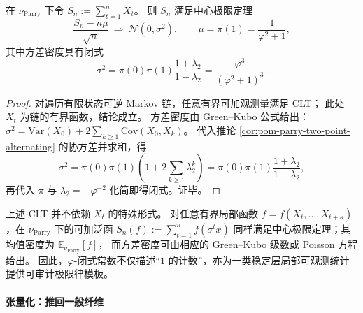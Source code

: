 \begin{theorem}\label{thm:pom-parry-ones-clt}
在 \(\nu_{\mathrm{Parry}}\) 下令
\(
S_n:=\sum_{t=1}^{n}X_t
\)。
则 \(S_n\) 满足中心极限定理
\[
\frac{S_n-n\mu}{\sqrt n}\ \Longrightarrow\ \mathcal N(0,\sigma^2),
\qquad
\mu=\pi(1)=\frac{1}{\varphi^2+1},
\]
其中方差密度具有闭式
\[
\sigma^2
=\pi(0)\pi(1)\frac{1+\lambda_2}{1-\lambda_2}
=\frac{\varphi^3}{(\varphi^2+1)^3}.
\]
\end{theorem}
\begin{proof}
对遍历有限状态可逆 Markov 链，任意有界可加观测量满足 CLT；
此处 \(X_t\) 为链的有界函数，结论成立。
方差密度由 Green--Kubo 公式给出：
\(
\sigma^2=\mathrm{Var}(X_0)+2\sum_{k\ge 1}\mathrm{Cov}(X_0,X_k)
\)。
代入推论 \ref{cor:pom-parry-two-point-alternating} 的协方差并求和，得
\[
\sigma^2=\pi(0)\pi(1)\left(1+2\sum_{k\ge 1}\lambda_2^k\right)
=\pi(0)\pi(1)\frac{1+\lambda_2}{1-\lambda_2},
\]
再代入 \(\pi\) 与 \(\lambda_2=-\varphi^{-2}\) 化简即得闭式。证毕。
\end{proof}

\begin{remark}[一般有限窗可加观测量]\label{rem:pom-parry-additive-functional-clt}
上述 CLT 并不依赖 \(X_t\) 的特殊形式。
对任意有界局部函数 \(f=f(X_t,\dots,X_{t+\kappa})\)，在 \(\nu_{\mathrm{Parry}}\) 下的可加泛函
\(
S_n(f):=\sum_{t=1}^{n}f(\sigma^t x)
\)
同样满足中心极限定理；其均值密度为 \(\mathbb E_{\nu_{\mathrm{Parry}}}[f]\)，
而方差密度可由相应的 Green--Kubo 级数或 Poisson 方程给出。
因此，\(\varphi\)-闭式常数不仅描述“\(1\) 的计数”，亦为一类稳定层局部可观测统计提供可审计极限律模板。
\end{remark}

\paragraph{张量化：推回一般纤维}

